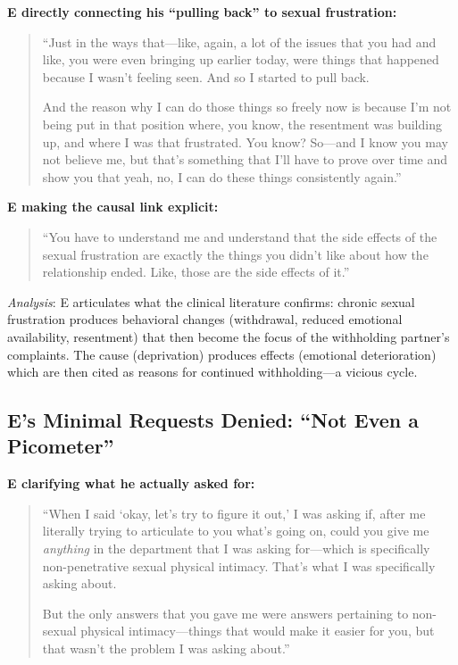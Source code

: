 \documentclass[12pt,openany]{book}
\numberwithin{equation}{chapter}
\begin{document}
\textbf{E directly connecting his ``pulling back'' to sexual frustration:}
\begin{quote}
``Just in the ways that---like, again, a lot of the issues that you had and like, you were even bringing up earlier today, were things that happened because I wasn't feeling seen. And so I started to pull back.

And the reason why I can do those things so freely now is because I'm not being put in that position where, you know, the resentment was building up, and where I was that frustrated. You know? So---and I know you may not believe me, but that's something that I'll have to prove over time and show you that yeah, no, I can do these things consistently again.''
\end{quote}

\textbf{E making the causal link explicit:}
\begin{quote}
``You have to understand me and understand that the side effects of the sexual frustration are exactly the things you didn't like about how the relationship ended. Like, those are the side effects of it.''
\end{quote}

\textit{Analysis}: E articulates what the clinical literature confirms: chronic sexual frustration produces behavioral changes (withdrawal, reduced emotional availability, resentment) that then become the focus of the withholding partner's complaints. The cause (deprivation) produces effects (emotional deterioration) which are then cited as reasons for continued withholding---a vicious cycle.

\subsection{E's Minimal Requests Denied: ``Not Even a Picometer''}

\textbf{E clarifying what he actually asked for:}
\begin{quote}
``When I said `okay, let's try to figure it out,' I was asking if, after me literally trying to articulate to you what's going on, could you give me \textit{anything} in the department that I was asking for---which is specifically non-penetrative sexual physical intimacy. That's what I was specifically asking about.

But the only answers that you gave me were answers pertaining to non-sexual physical intimacy---things that would make it easier for you, but that wasn't the problem I was asking about.''
\end{quote}
\end{document}
